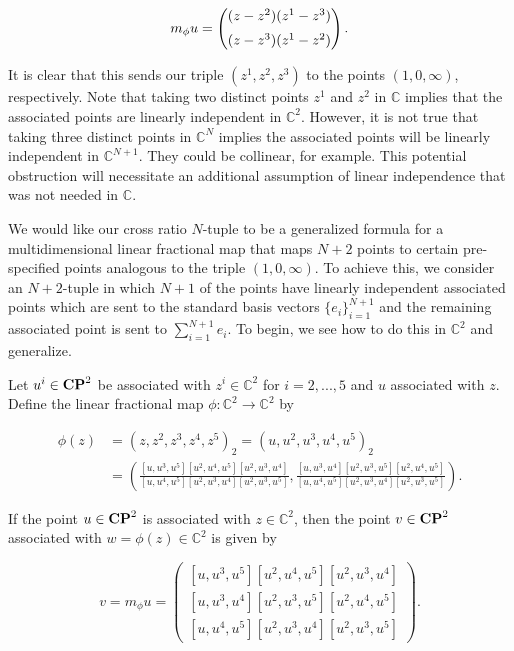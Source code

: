 \documentclass{amsart}
\theoremstyle{theorem}
\theoremstyle{lemma}
\theoremstyle{definition}
\begin{document}
$$m_{\phi} u=\begin{pmatrix}(z-z^2)(z^1-z^3) \vspace{2mm} \\   (z-z^3)(z^1-z^2) \end{pmatrix}.$$

It is clear that this sends our triple $(z^1, z^2, z^3)$ to the points $(1,0, \infty)$, respectively. Note that taking two distinct points $z^1$ and $z^2$ in $\mathbb{C}$ implies that the associated points are linearly independent in $\mathbb{C}^2$. However, it is not true that taking three distinct points in $\mathbb{C}^N$ implies the associated points will be linearly independent in $\mathbb{C}^{N+1}$. They could be collinear, for example. This potential obstruction will necessitate an additional assumption of linear independence that was not needed in $\mathbb{C}$. 

We would like our cross ratio $N$-tuple to be a generalized formula for a multidimensional linear fractional map that maps $N+2$ points to certain pre-specified points analogous to the triple $(1,0, \infty)$. To achieve this, we consider an $N+2$-tuple in which $N+1$ of the points have linearly independent associated points which are sent to the standard basis vectors $\{e_i\}_{i=1}^{N+1}$ and the remaining associated point is sent to $\sum_{i=1}^{N+1}e_i$. To begin, we see how to do this in $\mathbb{C}^2$ and generalize. 

Let $u^i \in {\bf CP}^2$ be associated with $z^i \in \mathbb{C}^2$ for $i=2,...,5$ and $u$ associated with $z$. Define the linear fractional map $\phi: \mathbb{C}^2 \rightarrow \mathbb{C}^2$ by

\begin{align*}
\phi(z)&=(z, z^2 , z^3, z^4,z^5)_2=(u, u^2, u^3, u^4, u^5)_2\\
&=\left( \frac{[u, u^3,u^5][u^2,u^4,u^5][u^2,u^3,u^4]}{[u, u^4,u^5][u^2,u^3,u^4][u^2,u^3,u^5]}, \frac{[u,u^3,u^4][u^2,u^3,u^5][u^2,u^4,u^5]}{[u, u^4,u^5][u^2,u^3,u^4][u^2,u^3,u^5]} \right).
\end{align*}

If the point $u \in {\bf CP}^2$ is associated with $z \in \mathbb{C}^2$, then the point $v \in {\bf CP}^2$ associated with $w=\phi(z) \in \mathbb{C}^2$ is given by

\begin{equation}\label{cr}
v=m_{\phi}u=\begin{pmatrix}
        [u, u^3,u^5][u^2,u^4,u^5][u^2,u^3,u^4] \\
        [u,u^3,u^4][u^2,u^3,u^5][u^2,u^4,u^5]\\
        [u, u^4,u^5][u^2,u^3,u^4][u^2,u^3,u^5]
     \end{pmatrix}.
\end{equation}
\end{document}
